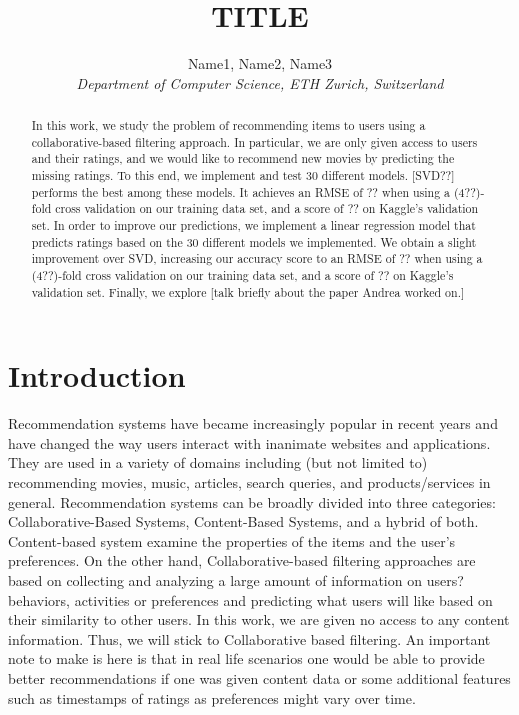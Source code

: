 \documentclass[10pt,conference,compsocconf]{IEEEtran}
\begin{document}
\title{TITLE}

\author{
  Name1, Name2, Name3\\
  \textit{Department of Computer Science, ETH Zurich, Switzerland}
}

\maketitle

\begin{abstract}
	In this work, we study the problem of recommending items to users using a collaborative-based filtering approach. In particular, we are only given access to users and their ratings, and we would like to recommend new movies by predicting the missing ratings. To this end, we implement and test 30 different models. [SVD??] performs the best among these models. It achieves an  RMSE of ?? when using a (4??)-fold cross validation on our training data set, and a score of ?? on Kaggle's validation set. In order to improve our predictions, we implement a linear regression model that predicts ratings based on the 30 different models we implemented. We obtain a slight improvement over SVD, increasing our accuracy score to an RMSE of ?? when using a (4??)-fold cross validation on our training data set, and a score of ?? on Kaggle's validation set. Finally, we explore [talk briefly about the paper Andrea worked on.]
\end{abstract}

\section{Introduction}
Recommendation systems have became increasingly popular in recent years and have changed the way users interact with inanimate websites and applications. They are used in a variety of domains including (but not limited to) recommending movies, music, articles, search queries, and products/services in general. Recommendation systems can be broadly divided into three categories: Collaborative-Based Systems, Content-Based Systems, and a hybrid of both. Content-based system examine the properties of the items and the user's preferences. On the other hand, Collaborative-based filtering approaches are based on collecting and analyzing a large amount of information on users? behaviors, activities or preferences and predicting what users will like based on their similarity to other users. In this work, we are given no access to any content information. Thus, we will stick to Collaborative based filtering. An important note to make is here is that in real life scenarios one would be able to provide better recommendations if one was given content data or some additional features such as timestamps of ratings as preferences might vary over time.
\end{document}
